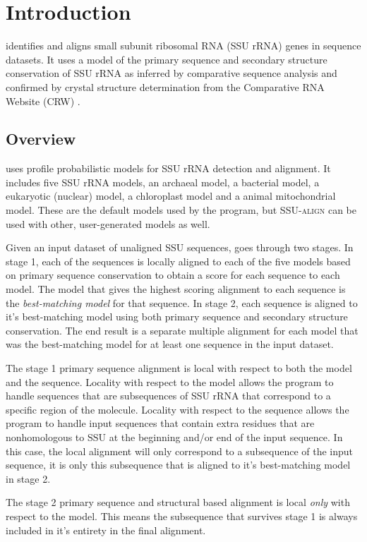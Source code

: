\section{Introduction}

 identifies and aligns small subunit ribosomal RNA
(SSU rRNA) genes in sequence datasets. It uses a model of the primary
sequence and secondary structure conservation of SSU rRNA as inferred
by comparative sequence analysis and confirmed by crystal structure
determination from the Comparative RNA Website (CRW) \cite{Cannone02}.

\subsection{Overview}
 uses profile probabilistic models for SSU rRNA
detection and alignment. It includes five SSU rRNA models, an archaeal
model, a bacterial model, a eukaryotic (nuclear) model, a
chloroplast model and a animal mitochondrial model. These are the
default models used by the program, but \textsc{SSU-align} can be used
with other, user-generated models as well.

Given an input dataset of unaligned SSU sequences,
 goes through two stages. In stage 1, each of the
sequences is locally aligned to each of the five models based on
primary sequence conservation to obtain a score for each sequence to
each model.  The model that gives the highest scoring alignment to
each sequence is the \emph{best-matching model} for that sequence.  In
stage 2, each sequence is aligned to it's best-matching model using
both primary sequence and secondary structure conservation. The end
result is a separate multiple alignment for each model that was the
best-matching model for at least one sequence in the input dataset.

The stage 1 primary sequence alignment is local with respect to both
the model and the sequence. Locality with respect to the model allows
the program to handle sequences that are subsequences of SSU
rRNA that correspond to a specific region of the molecule. Locality
with respect to the sequence allows the program to handle input
sequences that contain extra residues that are nonhomologous to SSU at
the beginning and/or end of the input sequence. In this case, the
local alignment will only correspond to a subsequence of the input
sequence, it is only this subsequence that is aligned to it's
best-matching model in stage 2.

The stage 2 primary sequence and structural based alignment is local
\emph{only} with respect to the model.  This means the subsequence
that survives stage 1 is always included in it's entirety in the final
alignment.

